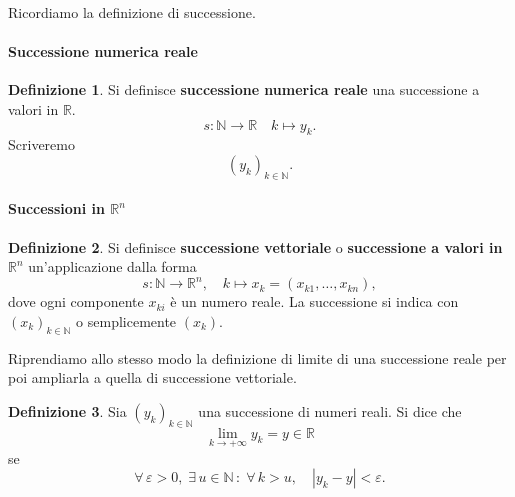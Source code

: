 \documentclass{article}
\theoremstyle{plain}
\theoremstyle{definition}
\newtheorem{defn}{Definizione}[section]
\theoremstyle{remark}
\begin{document}
\vspace{10pt}

Ricordiamo la definizione di successione.

\vspace{10pt}

\paragraph{Successione numerica reale}
\begin{bxthm}
\begin{defn}
    Si definisce \textbf{successione numerica reale} una successione a valori in $\mathbb{R}$.
    \[s:\mathbb{N}\to \mathbb{R}\quad k\mapsto y_k.\]
    Scriveremo \[(y_k)_{k\in\mathbb{N}}.\]
\end{defn}
\end{bxthm}

\vspace{10pt}

\paragraph{Successioni in $\mathbb{R}^n$}
\begin{bxthm}
\begin{defn}
    Si definisce \textbf{successione vettoriale} o \textbf{successione a valori in $\mathbb{R}^n$} un'applicazione dalla forma
    \[s:\mathbb{N}\to\mathbb{R}^n, \quad k\mapsto x_k=(x_{k1},\ldots,x_{kn}),\]
    dove ogni componente $x_{ki}$ è un numero reale. La successione si indica con $(x_k)_{k\in\mathbb{N}}$ o semplicemente $(x_k)$.
\end{defn}
\end{bxthm}

\vspace{10pt}

Riprendiamo allo stesso modo la definizione di limite di una successione reale per poi ampliarla a quella di successione vettoriale.

\vspace{10pt}

\begin{bxthm}
\begin{defn}
    Sia $(y_k)_{k\in\mathbb{N}}$ una successione di numeri reali. Si dice che 
    \[\lim_{k\to+\infty} y_k = y \in \mathbb{R}\]
    se \[\forall\,\varepsilon>0,\; \exists\, u\in\mathbb{N}\,:\;\forall\, k>u,\quad |y_k-y|<\varepsilon.\]
\end{defn}
\end{bxthm}
\end{document}
